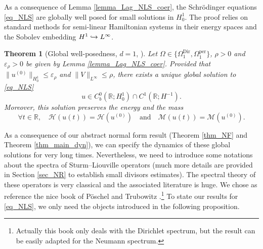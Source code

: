 \documentclass[JEP,XML,SOM,Unicode,NoEqCountersInSection,published]{cedram}
\newcommand\hto{\mathrel{\lhook\joinrel\to}}
\newtheorem{theorem}{Theorem}[section]
\theoremstyle{definition}
\begin{document}
As a consequence of Lemma \ref{lemma_Lag_NLS_coer}, the Schrödinger equations \eqref{eq_NLS} are globally well posed for small solutions in $H^1_0$.
The proof relies on standard methods for semi-linear Hamiltonian systems in their energy spaces and the Sobolev embedding $H^1 \hto L^{\infty}$.
\begin{theorem}[Global well-posedness, $d=1$, {\cite[Cor.\,3.5.3, p.\,77]{Caz03}}]
\label{thm_GWP_NLS_1d}
Let $\Omega \in \{ \Omega^{\mathrm{Dir}}_1, \Omega^{\mathrm{per}}_1 \}$, $\rho >0$ and $\varepsilon_{\rho}>0$ be given by Lemma \ref{lemma_Lag_NLS_coer}. Provided that $\|u^{(0)} \|_{H^1_0} \leq \varepsilon_{\rho}$ and $\| V\|_{L^\infty} \leq \rho$, there exists a unique global solution to \eqref{eq_NLS}
\[
u \in C^0_b(\mathbb{R}; H^1_0) \cap C^1(\mathbb{R};H^{-1}).
\]
Moreover, this solution preserves the energy and the mass
\[
\forall t\in \mathbb{R}, \quad \mathcal{H}(u(t)) = \mathcal{H}(u^{(0)}) \quad \text{and} \quad \mathcal{M}(u(t)) = \mathcal{M}(u^{(0)}).
\]
\end{theorem}

As a consequence of our abstract normal form result (\ie Theorem \ref{thm_NF} and Theorem \ref{thm_main_dyn}), we can specify the dynamics of these global solutions for very long times. Nevertheless, we need to introduce some notations about the spectra of Sturm--Liouville operators (much more details are provided in Section \ref{sec_NR} to establish small divisors estimates). The spectral theory of these operators is very classical and the associated literature is huge. We chose as reference the nice book of Pöschel and Trubowitz \cite{PT}.\footnote{Actually this book only deals with the Dirichlet spectrum, but the result can be easily adapted for the Neumann spectrum.} To state our results for \eqref{eq_NLS}, we only need the objects introduced in the following proposition.
\end{document}
